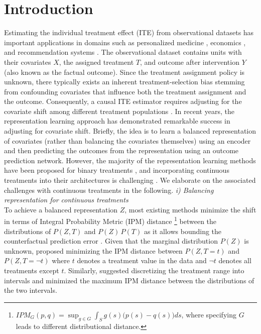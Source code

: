 \documentclass[letterpaper]{article} %
\begin{document}
\section{Introduction}
Estimating the individual treatment effect (ITE) from observational datasets has 
important applications in domains such as personalized medicine \cite{kent2018personalized, prosperi2020causal}, economics \cite{doi:10.1073/pnas.1510479113}, and recommendation systems \cite{10.1145/3383313.3412225}. The observational dataset contains units with their covariates $X$, the assigned treatment $T$, and outcome after intervention $Y$  (also known as the factual outcome). Since the treatment assignment policy is unknown, there typically exists an inherent treatment-selection bias stemming from confounding covariates that influence both the treatment assignment and the outcome. Consequently, a causal ITE estimator requires adjusting for the covariate shift among different treatment populations \cite{bareinboim2022recovering, bareinboim2012controlling}.
\newline
\newline
In recent years, the representation learning approach \cite{pmlr-v48-johansson16, shalit2017estimating} has demonstrated remarkable success in adjusting for covariate shift. Briefly, the idea is to learn a balanced representation of covariates (rather than balancing the covariates themselves) using an encoder and then predicting the outcomes from the representation using an outcome prediction network.
However, the majority of the representation learning methods have been proposed for binary treatments \cite{hassanpour2019learning, zhang2021treatment, Yao2018RepresentationLF}, and incorporating continuous treatments into their architectures is challenging \cite{chu2023causal}. We elaborate on the associated challenges with continuous treatments in the following.
\newline
\newline
\textit{i) Balancing representation for continuous treatments}\\
To achieve a balanced representation $Z$, most existing methods minimize the shift in terms of Integral Probability Metric (IPM) distance \footnote{$
IPM_{G}(p, q) = \sup_{g \in G} \int_{S} g(s) \big(p(s) - q(s) \big) ds
$, where specifying $G$ leads to different distributional distance. } \cite{sriperumbudur2009integral} between the distributions of $P(Z, T)$ and $P(Z)\,P(T)$ as it allows bounding the counterfactual prediction error \cite{shalit2017estimating}.
Given that the marginal distribution $P(Z)$ is unknown, \cite{bellot2022generalization} proposed minimizing the IPM distance between $P(Z, T=t)$ and $P(Z, T=\lnot t)$ where $t$ denotes a treatment value in the data and $\lnot t$ denotes all treatments except $t$. Similarly, \cite{NEURIPS2022_390bb66a} suggested discretizing the treatment range into intervals and minimized the maximum IPM distance between the distributions of the two intervals. 
\end{document}
